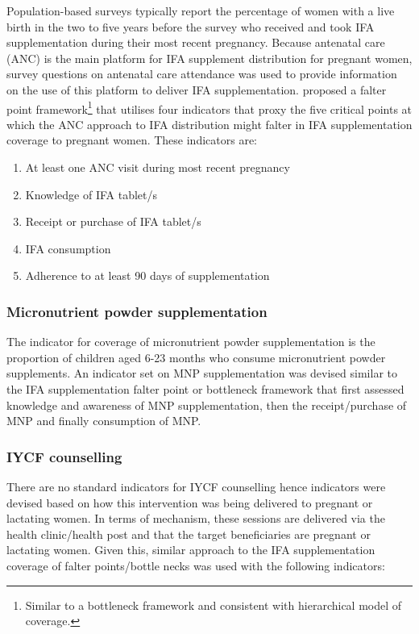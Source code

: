\documentclass[12pt,a4paper]{article}
\begin{document}
Population-based surveys typically report the percentage of women with a live birth in the two to five years before the survey who received and took IFA supplementation during their most recent pregnancy. Because antenatal care (ANC) is the main platform for IFA supplement distribution for pregnant women, survey questions on antenatal care attendance was used to provide information on the use of this platform to deliver IFA supplementation. \citet{Sununtnasuk:2015kb} proposed a falter point framework\footnote{Similar to a bottleneck framework and consistent with \citet{Tanahashi:1978we} hierarchical model of coverage.} that utilises four indicators that proxy the five critical points at which the ANC approach to IFA distribution might falter in IFA supplementation coverage to pregnant women. These indicators are:

\begin{enumerate}
\def\labelenumi{\arabic{enumi}.}
\item
  At least one ANC visit during most recent pregnancy
\item
  Knowledge of IFA tablet/s
\item
  Receipt or purchase of IFA tablet/s
\item
  IFA consumption
\item
  Adherence to at least 90 days of supplementation
\end{enumerate}

\hypertarget{micronutrient-powder-supplementation}{%
\subsubsection{Micronutrient powder supplementation}\label{micronutrient-powder-supplementation}}

The indicator for coverage of micronutrient powder supplementation is the proportion of children aged 6-23 months who consume micronutrient powder supplements. An indicator set on MNP supplementation was devised similar to the IFA supplementation falter point or bottleneck framework that first assessed knowledge and awareness of MNP supplementation, then the receipt/purchase of MNP and finally consumption of MNP.

\hypertarget{iycf-counselling}{%
\subsubsection{IYCF counselling}\label{iycf-counselling}}

There are no standard indicators for IYCF counselling hence indicators were devised based on how this intervention was being delivered to pregnant or lactating women. In terms of mechanism, these sessions are delivered via the health clinic/health post and that the target beneficiaries are pregnant or lactating women. Given this, similar approach to the IFA supplementation coverage of falter points/bottle necks was used with the following indicators:
\end{document}

